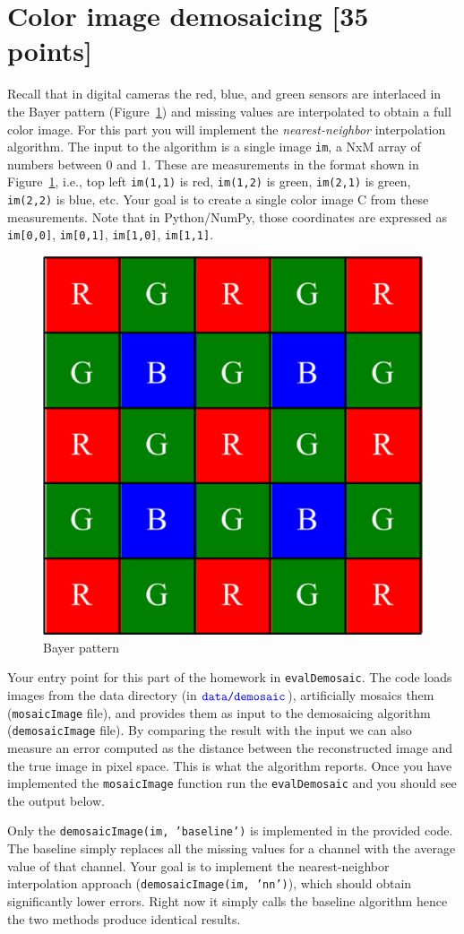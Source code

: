 \documentclass[10pt,letterpaper]{article}
\newcommand{\cmd}[1] {{\color{blue}\texttt{#1}}}
\begin{document}
\section{Color image demosaicing [35 points]}
Recall that in digital cameras the red, blue, and green sensors are interlaced in the Bayer pattern (Figure~\ref{fig:bayer}) and missing values are interpolated to obtain a full color image. 
For this part you will implement the \emph{nearest-neighbor} interpolation algorithm. 
The input to the algorithm is a single image \cmd{im}, a NxM array of numbers between 0 and 1. 
These are measurements in the format shown in Figure~\ref{fig:bayer}, i.e., top left \cmd{im(1,1)} is red, \cmd{im(1,2)} is green, \cmd{im(2,1)} is green, \cmd{im(2,2)} is blue, etc. Your goal is to create a single color image C from these measurements. Note that in Python/NumPy, those coordinates are expressed as \cmd{im[0,0]}, \cmd{im[0,1]}, \cmd{im[1,0]}, \cmd{im[1,1]}.
\begin{figure}[h]
\centering
\includegraphics[width=0.2\linewidth]{bayer-pattern.png}
\caption{\label{fig:bayer} Bayer pattern}
\end{figure}

Your entry point for this part of the homework in \cmd{evalDemosaic}. The code loads images from the data directory (in $\cmd{data/demosaic}$), artificially mosaics them (\cmd{mosaicImage} file), and provides them as input to the demosaicing algorithm (\cmd{demosaicImage} file). By comparing the result with the input we can also measure an error computed as the distance between the reconstructed image and the true image in pixel space. This is what the algorithm reports. Once you have implemented the \cmd{mosaicImage} function run the \cmd{evalDemosaic} and you should see the output below.

Only the \cmd{demosaicImage(im, 'baseline')} is implemented in the provided code. The baseline simply replaces all the missing values for a channel with the average value of that channel. 
Your goal is to implement the nearest-neighbor interpolation approach (\cmd{demosaicImage(im, 'nn')}), which should obtain significantly lower errors.
Right now it simply calls the baseline algorithm hence the two methods produce identical results.
\end{document}
